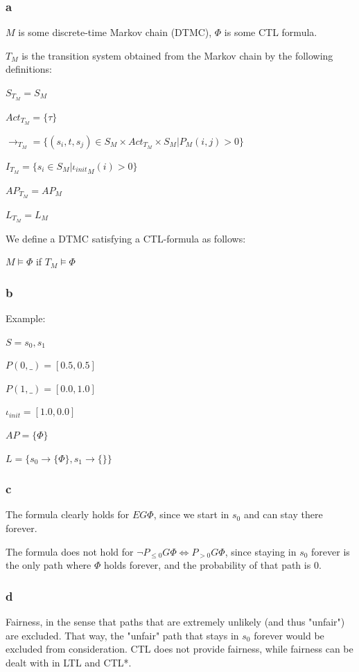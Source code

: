 \subsubsection{a}

$M$ is some discrete-time Markov chain (DTMC),
$\Phi$ is some CTL formula.

$T_M$ is the transition system obtained from the Markov chain
by the following definitions:

$S_{T_M} = S_M$

$Act_{T_M} = \{\tau\}$

$\to_{T_M} = \{(s_i, t, s_j) \in S_M \times Act_{T_M} \times S_M | P_M(i, j) > 0\}$

$I_{T_M} = \{s_i \in S_M | {\iota_{init}}_M(i) > 0\}$

$AP_{T_M} = AP_M$

$L_{T_M} = L_M$

We define a DTMC satisfying a CTL-formula as follows:

$M \models \Phi$ if $T_M \models \Phi$

\subsubsection{b}

Example:

$S = {s_0, s_1}$

$P(0, \_) = [0.5, 0.5]$

$P(1, \_) = [0.0, 1.0]$

$\iota_{init} = [1.0, 0.0]$

$AP = \{\Phi\}$

$L = \{s_0 \to \{\Phi\}, s_1 \to \{\}\}$

\subsubsection{c}

The formula clearly holds for $EG \Phi$,
since we start in $s_0$ and can stay there
forever.

The formula does not hold for $\neg P_{\leq 0} G \Phi \Leftrightarrow P_{>0} G \Phi$,
since staying in $s_0$ forever is the only
path where $\Phi$ holds forever,
and the probability of that path is 0.

\subsubsection{d}

Fairness, in the sense that paths that are extremely unlikely (and thus "unfair")
are excluded.
That way, the "unfair" path that stays in $s_0$ forever would be excluded from consideration.
CTL does not provide fairness, while fairness can be dealt with in LTL and CTL*.

